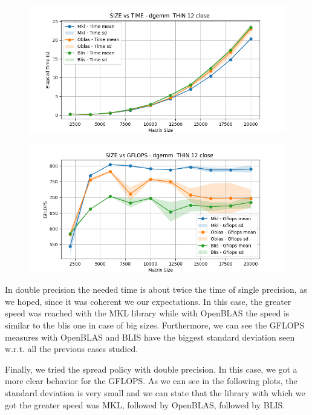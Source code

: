 \documentclass{article}
\begin{document}
\begin{figure}[H]
    \centering
    \includegraphics[width=\textwidth]{THIN 12/dgemm__THIN_12_close_time.png}
\end{figure}

\begin{figure}[H]
    \centering
    \includegraphics[width=\textwidth]{THIN 12/dgemm__THIN_12_close_gflops.png}
\end{figure}

In double precision the needed time is about twice the time of single precision, as we hoped, since it was coherent we our expectations. In this case, the greater speed was reached with the MKL library while with OpenBLAS the speed is similar to the blis one in case of big sizes. Furthermore, we can see the GFLOPS measures with OpenBLAS and BLIS have the biggest standard deviation seen w.r.t. all the previous cases studied.  

Finally, we tried the spread policy with double precision. In this case, we got a more clear behavior for the GFLOPS. As we can see in the following plots, the standard deviation is very small and we can state that the library with which we got the greater speed was MKL, followed by OpenBLAS, followed by BLIS.  
\end{document}
